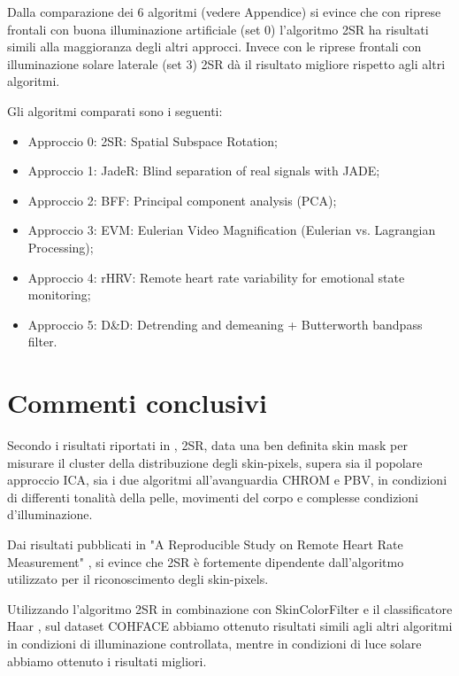 \documentclass[journal,A4paper,compsoc,epsfig]{IEEEtran}
\begin{document}
    Dalla comparazione dei 6 algoritmi (vedere Appendice) si evince che con riprese frontali con buona illuminazione artificiale (set 0) l'algoritmo 2SR ha risultati simili alla maggioranza degli altri approcci.
    Invece con le riprese frontali con illuminazione solare laterale (set 3) 2SR dà il risultato migliore rispetto agli altri algoritmi.

    Gli algoritmi comparati sono i seguenti:
    \begin{itemize}
      \item Approccio 0: 2SR: Spatial Subspace Rotation;
      \item Approccio 1: JadeR: Blind separation of real signals with JADE;
      \item Approccio 2: BFF: Principal component analysis (PCA);
      \item Approccio 3: EVM: Eulerian Video Magnification (Eulerian vs. Lagrangian Processing);
      \item Approccio 4: rHRV: Remote heart rate variability for emotional state monitoring;
      \item Approccio 5: D\&D: Detrending and demeaning + Butterworth bandpass filter.
    \end{itemize}
  
  \section{Commenti conclusivi}
    \label{sec:Commenti}
    Secondo i risultati riportati in \cite{wang-tbe-2016}, 2SR, data una ben definita skin mask per misurare il cluster della distribuzione degli skin-pixels, supera sia il popolare approccio ICA, sia i due algoritmi all'avanguardia CHROM e PBV, in condizioni di differenti tonalità della pelle, movimenti del corpo e complesse condizioni d'illuminazione.

    Dai risultati pubblicati in "A Reproducible Study on Remote Heart Rate Measurement" \cite{arXiv:1709.00962}, si evince che 2SR è fortemente dipendente dall'algoritmo utilizzato per il riconoscimento degli skin-pixels.

    Utilizzando l'algoritmo 2SR in combinazione con SkinColorFilter \cite{adaptive_skin_segmentation} e il classificatore Haar \cite{skin_color_filter}, sul dataset COHFACE abbiamo ottenuto risultati simili agli altri algoritmi in condizioni di illuminazione controllata, mentre in condizioni di luce solare abbiamo ottenuto i risultati migliori.
  
  
\end{document}
